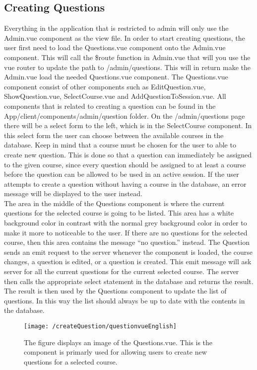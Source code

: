 \subsection{Creating Questions}
Everything in the application that is restricted to admin will only use the Admin.vue component as the view file. In order to start creating questions, the user first need to load the Questions.vue component onto the Admin.vue component. This will call the \$route function in Admin.vue that will you use the vue router to update the path to /admin/questions. This will in return make the Admin.vue load the needed Questions.vue component. The Questions.vue component consist of other components such as EditQuestion.vue, ShowQuestion.vue, SelectCourse.vue and AddQuestionToSession.vue. All components that is related to creating a question can be found in the App/client/components/admin/question folder. On the /admin/questions page there will be a select form to the left, which is in the SelectCourse component. In this select form the user can choose between the available courses in the database. Keep in mind that a course must be chosen for the user to able to create new question. This is done so that a question can immediately be assigned to the given course, since every question should be assigned to at least a course before the question can be allowed to be used in an active session.  If the user attempts to create a question without having a course in the database, an error message will be displayed to the user instead.\\[11pt]
The area in the middle of the Questions component is where the current questions for the selected course is going to be listed. This area has a white background color in contrast with the normal grey background color in order to make it more to noticeable to the user. If there are no questions for the selected course, then this area contains the message “no question.” instead. The Question sends an emit request to the server whenever the component is loaded, the course changes, a question is edited, or a question is created. This emit message will ask server for all the current questions for the current selected course. The server then calls the appropriate select statement in the database and returns the result. The result is then used by the Questions component to update the list of questions. In this way the list should always be up to date with the contents in the database. 
\begin{figure}[H]
	\centering
	\texttt{[image: /createQuestion/questionvueEnglish]}
	\caption{The figure displays an image of the Questions.vue. This is the component is primarly used for allowing users to create new questions for a selected course. }
	\label{fig:questionVue}
\end{figure}
